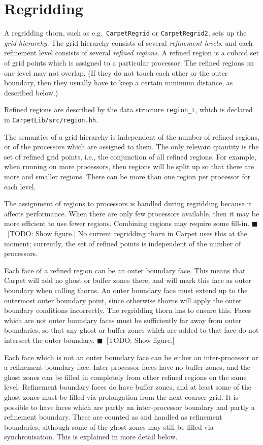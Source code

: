 \documentclass[nofootinbib, twocolumn]{revtex4}
\newcommand{\todo}[1]{{\color{blue}$\blacksquare$~\textsf{[TODO: #1]}}}
\begin{document}
\section{Regridding}

A regridding thorn, such as e.g.\ \texttt{CarpetRegrid} or
\texttt{CarpetRegrid2}, sets up the \emph{grid hierarchy}.  The grid
hierarchy consists of several \emph{refinement levels}, and each
refinement level consists of several \emph{refined regions}.  A
refined region is a cuboid set of grid points which is assigned to a
particular processor.  The refined regions on one level may not
overlap.  (If they do not touch each other or the outer boundary, then
they usually have to keep a certain minimum distance, as described
below.)

Refined regions are described by the data structure
\texttt{region\_t}, which is declared in
\texttt{CarpetLib/src/region.hh}.

The semantics of a grid hierarchy is independent of the number of
refined regions, or of the processors which are assigned to them.  The
only relevant quantity is the set of refined grid points, i.e., the
conjunction of all refined regions.  For example, when running on more
processors, then regions will be split up so that there are more and
smaller regions.  There can be more than one region per processor for
each level.

The assignment of regions to processors is handled during regridding
because it affects performance.  When there are only few processors
available, then it may be more efficient to use fewer regions.
Combining regions may require some fill-in.  \todo{Show figure.}  No
current regridding thorn in Carpet uses this at the moment; currently,
the set of refined points is independent of the number of processors.

Each face of a refined region can be an outer boundary face.  This
means that Carpet will add no ghost or buffer zones there, and will
mark this face as outer boundary when calling thorns.  An outer
boundary face must extend up to the outermost outer boundary point,
since otherwise thorns will apply the outer boundary conditions
incorrectly.  The regridding thorn has to ensure this.  Faces which
are not outer boundary faces must be sufficiently far away from outer
boundaries, so that any ghost or buffer zones which are added to that
face do not intersect the outer boundary.  \todo{Show figure.}

Each face which is not an outer boundary face can be either an
inter-processor or a refinement boundary face.  Inter-processor faces
have no buffer zones, and the ghost zones can be filled in completely
from other refined regions on the same level.  Refinement boundary
faces do have buffer zones, and at least some of the ghost zones must
be filled via prolongation from the next coarser grid.  It is possible
to have faces which are partly an inter-processor boundary and partly
a refinement boundary.  These are counted as and handled as refinement
boundaries, although some of the ghost zones may still be filled via
synchronisation.  This is explained in more detail below.
\end{document}
